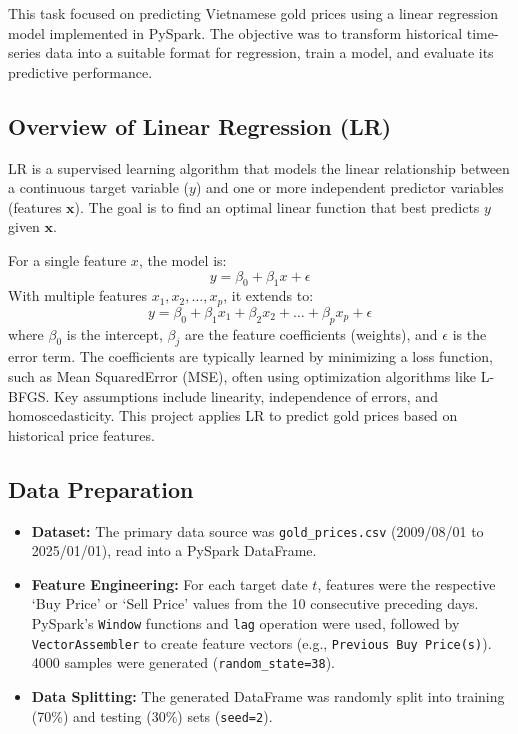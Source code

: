 This task focused on predicting Vietnamese gold prices using a linear regression model implemented in PySpark.
The objective was to transform historical time-series data into a suitable format for regression,
train a model, and evaluate its predictive performance.

\subsection{Overview of Linear Regression (LR)}
\label{subsec:overview-of-linear-regression}

LR is a supervised learning algorithm that models the linear relationship between a continuous target variable ($y$) and one or more independent predictor variables (features $\mathbf{x}$). The goal is to find an optimal linear function that best predicts $y$ given $\mathbf{x}$.

For a single feature $x$, the model is:
\begin{equation}
    y = \beta_0 + \beta_1 x + \epsilon
    \label{eq:simple_lr}
\end{equation}
With multiple features $x_1, x_2, \ldots, x_p$, it extends to:
\begin{equation}
    y = \beta_0 + \beta_1 x_1 + \beta_2 x_2 + \ldots + \beta_p x_p + \epsilon
    \label{eq:multiple_lr}
\end{equation}
where $\beta_0$ is the intercept, $\beta_j$ are the feature coefficients (weights), and $\epsilon$ is the error term.
The coefficients are typically learned by minimizing a loss function, such as Mean SquaredError (MSE), often using optimization algorithms like L-BFGS. Key assumptions include linearity, independence of errors, and homoscedasticity.
This project applies LR to predict gold prices based on historical price features.

\subsection{Data Preparation}
\label{subsec:data-preparation}
\begin{itemize}
    \item \textbf{Dataset:} The primary data source was \texttt{gold\_prices.csv} (2009/08/01 to 2025/01/01),
    read into a PySpark DataFrame.
    \item \textbf{Feature Engineering:} For each target date $t$, features were the respective `Buy Price' or `Sell Price' values from the 10 consecutive preceding days.
    PySpark's \texttt{Window} functions and \texttt{lag} operation were used, followed by \texttt{VectorAssembler} to create feature vectors (e.g., \texttt{Previous Buy Price(s)}). 4000 samples were generated (\texttt{random\_state=38}).
    \item \textbf{Data Splitting:} The generated DataFrame was randomly split into training (70\%) and testing (30\%) sets (\texttt{seed=2}).
\end{itemize}

